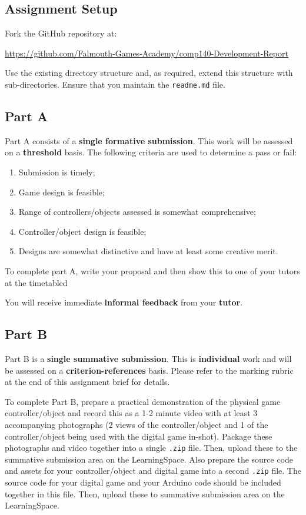 \documentclass{../../fal_assignment}
\begin{document}
	\subsection*{Assignment Setup}
	
	Fork the GitHub repository at:
	
	\indent \url{https://github.com/Falmouth-Games-Academy/comp140-Development-Report}
	
	Use the existing directory structure and, as required, extend this structure with sub-directories. Ensure that you maintain the \texttt{readme.md} file.
	

\subsection*{Part A}

Part A consists of a \textbf{single formative submission}. This work will be assessed on a \textbf{threshold} basis. The following criteria are used to determine a pass or fail:

\begin{enumerate}[label=(\alph*)]
	\item Submission is timely;
	\item Game design is feasible;
	\item Range of controllers/objects assessed is somewhat comprehensive;
	\item Controller/object design is feasible;
	\item Designs are somewhat distinctive and have at least some creative merit.
\end{enumerate}

To complete part A, write your proposal and then show this to one of your tutors at the timetabled

You will receive immediate \textbf{informal feedback} from your \textbf{tutor}.

\subsection*{Part B}

Part B is a \textbf{single summative submission}. This is \textbf{individual} work and will be assessed on a \textbf{criterion-references} basis. Please refer to the marking rubric at the end of this assignment brief for details.

To complete Part B, prepare a practical demonstration of the physical game controller/object and record this as a 1-2 minute video with at least 3 accompanying photographs (2 views of the controller/object and 1 of the controller/object being used with the digital game in-shot). Package these photographs and video together into a single \texttt{.zip} file. Then, upload these to the summative submission area on the LearningSpace. Also prepare the source code and assets for your controller/object and digital game into a second \texttt{.zip} file. The source code for your digital game and your Arduino code should be included together in this file. Then, upload these to summative submission area on the LearningSpace. 
\end{document}
